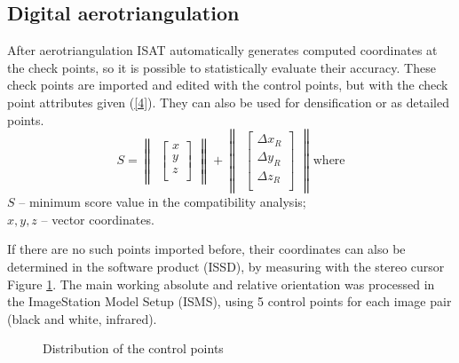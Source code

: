 \documentclass[12pt]{spieman}
\begin{document}
\subsection {Digital aerotriangulation}
 After aerotriangulation ISAT automatically generates computed coordinates at the check points, so it is possible to statistically evaluate their accuracy. These check points are imported and edited with the control points, but with the check point attributes given (\ref{4}). They can also be used for densification or as detailed points.  
 \begin{equation}
S =
\begin{Vmatrix}
\begin{bmatrix}
x \\
y \\
z \\
\end{bmatrix} 
\end{Vmatrix}
+
\begin{Vmatrix}
\begin{bmatrix}
\Delta{x_R} \\
\Delta{y_R}  \\
\Delta{z_R} \\
\end{bmatrix} 
\end{Vmatrix}
\label{4}
\text {where} 
\end{equation}
$S$  – minimum score value in the compatibility analysis;\\
$x, y, z$  – vector coordinates.

If there are no such points imported before, their coordinates can also be determined in the software product (ISSD), by measuring with the stereo cursor Figure \ref{f2}. The main working absolute and relative orientation was processed in the ImageStation Model Setup (ISMS), using 5 control points for each image pair (black and white, infrared). 
\begin{figure}[H] 
\caption{Distribution of the control points}
\label{f2}
\end{figure}
\end{document}
